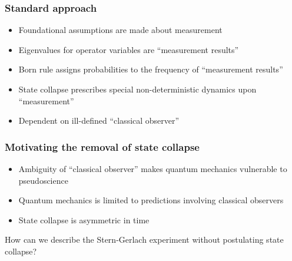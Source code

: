 \documentclass{beamer}
\newcommand{\apparatus}[4]{\node[square node] (#1) at (#2,#3){#4};
                             \node[port] (#1+) at (#2 + 0.375, #3 + 0.5){+};
                             \node[port] (#1-) at (#2 + 0.375, #3 - 0.5){-};}
\begin{document}
\begin{frame}
\frametitle{Standard approach}

\begin{figure}
\end{figure}

\begin{itemize}
  \item Foundational assumptions are made about measurement
  \item Eigenvalues for operator variables are ``measurement results''
  \item Born rule assigns probabilities to the frequency of ``measurement results''
  \item State collapse prescribes special non-deterministic dynamics upon ``measurement''
  \item Dependent on ill-defined ``classical observer''
\end{itemize}
\end{frame}

\begin{frame}
  \frametitle{Motivating the removal of state collapse}

  \begin{itemize}
    \item Ambiguity of ``classical observer'' makes quantum mechanics vulnerable to pseudoscience
    \item Quantum mechanics is limited to predictions involving classical observers
    \item State collapse is asymmetric in time
  \end{itemize}

  \bigskip \bigskip

How can we describe the Stern-Gerlach experiment without postulating state collapse?
\end{frame}
\end{document}
